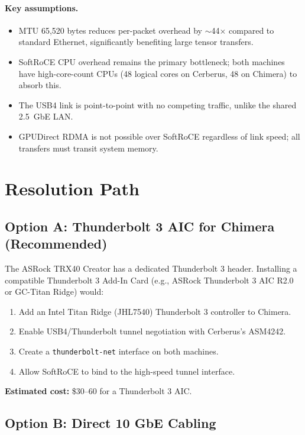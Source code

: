 \documentclass[11pt,letterpaper]{article}
\begin{document}
\paragraph{Key assumptions.}
\begin{itemize}
    \item MTU 65,520 bytes reduces per-packet overhead by $\sim$44$\times$ compared to standard Ethernet, significantly benefiting large tensor transfers.
    \item SoftRoCE CPU overhead remains the primary bottleneck; both machines have high-core-count CPUs (48 logical cores on Cerberus, 48 on Chimera) to absorb this.
    \item The USB4 link is point-to-point with no competing traffic, unlike the shared 2.5~GbE LAN.
    \item GPUDirect RDMA is not possible over SoftRoCE regardless of link speed; all transfers must transit system memory.
\end{itemize}

\section{Resolution Path}

\subsection{Option A: Thunderbolt 3 AIC for Chimera (Recommended)}

The ASRock TRX40 Creator has a dedicated Thunderbolt 3 header. Installing a compatible Thunderbolt 3 Add-In Card (e.g., ASRock Thunderbolt 3 AIC R2.0 or GC-Titan Ridge) would:

\begin{enumerate}
    \item Add an Intel Titan Ridge (JHL7540) Thunderbolt 3 controller to Chimera.
    \item Enable USB4/Thunderbolt tunnel negotiation with Cerberus's ASM4242.
    \item Create a \texttt{thunderbolt-net} interface on both machines.
    \item Allow SoftRoCE to bind to the high-speed tunnel interface.
\end{enumerate}

\textbf{Estimated cost:} \$30--60 for a Thunderbolt 3 AIC.

\subsection{Option B: Direct 10 GbE Cabling}
\end{document}
